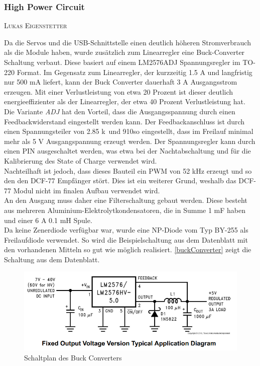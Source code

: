 \documentclass[12pt,a4paper,bibliography=totocnumbered,listof=totocnumbered]{article}
\makeatletter
\newcommand{\chapterauthor}[1]{%
  {\parindent0pt\vspace*{-5pt}%
  \linespread{1.1}\small\scshape#1%
  \par\nobreak\vspace*{3pt}}
  \@afterheading%
}
\makeatother
\begin{document}
\subsubsection{High Power Circuit}\label{HPC}
\chapterauthor{Lukas Eigenstetter}
Da die Servos und die USB-Schnittstelle einen deutlich höheren Stromverbrauch als die Module haben, wurde zusätzlich zum Linearregler eine Buck-Converter Schaltung verbaut.
Diese basiert auf einem LM2576ADJ Spannungsregler im TO-220 Format. \autocite{buckConverter}
Im Gegensatz zum Linearregler, der kurzzeitig 1.5 A und langfristig nur 500 mA liefert, kann der Buck Converter dauerhaft 3 A Ausgangsstrom erzeugen.
Mit einer Verlustleistung von etwa 20 Prozent ist dieser deutlich energieeffizienter als der Linearregler, der etwa 40 Prozent Verlustleistung hat.
Die Variante \emph{ADJ} hat den Vorteil, dass die Ausgangsspannung durch einen Feedbackwiderstand eingestellt werden kann.
Der Feedbackanschluss ist durch einen Spannungsteiler von 2.85 k\textOmega \ und 910\textOmega so eingestellt, dass im Freilauf minimal mehr als 5 V Ausgangspannung erzeugt werden.
Der Spannungsregler kann durch einen PIN ausgeschaltet werden, was etwa bei der Nachtabschaltung und für die Kalibrierung des State of Charge verwendet wird.\\
Nachteilhaft ist jedoch, dass dieses Bauteil ein PWM von 52 kHz erzeugt und so den den DCF-77 Empfänger stört.
Dies ist ein weiterer Grund, weshalb das DCF-77 Modul nicht im finalen Aufbau verwendet wird.\\
An den Ausgang muss daher eine Filterschaltung gebaut werden.
Diese besteht aus mehreren Aluminium-Elektrolytkondensatoren, die in Summe 1 mF haben und einer 6 A 0.1 mH Spule.\\
Da keine Zenerdiode verfügbar war, wurde eine NP-Diode vom Typ BY-255 als Freilaufdiode verwendet.
So wird die Beispielschaltung aus dem Datenblatt mit den vorhandenen Mitteln so gut wie möglich realisiert. \autoref{buckConverter} zeigt die Schaltung aus dem Datenblatt.

\begin{figure}[htpb] %
    \centering
    \includegraphics[width=13cm,keepaspectratio=true]{pics/buckConverter.png}
    \caption{Schaltplan des Buck Converters \autocite{buckConverter}}
    \label{buckConverter}
\end{figure}
\end{document}
